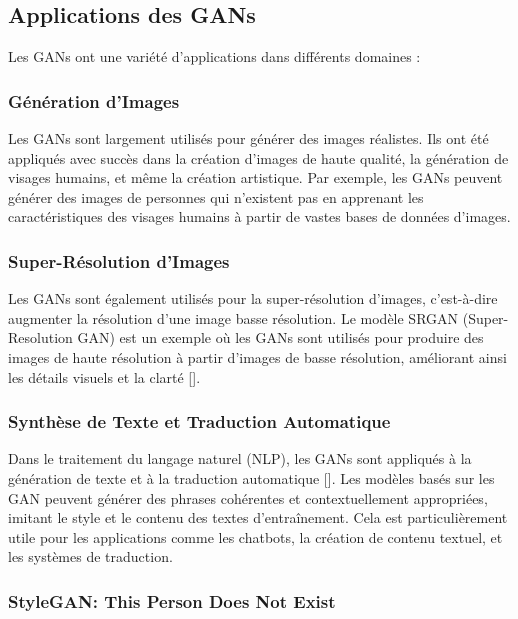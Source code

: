 \subsection{Applications des GANs}

Les GANs ont une variété d'applications dans différents domaines :

\subsubsection{Génération d'Images}

Les GANs sont largement utilisés pour générer des images réalistes. Ils ont été
appliqués avec succès dans la création d'images de haute qualité, la génération
de visages humains, et même la création artistique. Par exemple, les GANs
peuvent générer des images de personnes qui n'existent pas en apprenant les
caractéristiques des visages humains à partir de vastes bases de données
d'images.

\subsubsection{Super-Résolution d'Images}

Les GANs sont également utilisés pour la super-résolution d'images,
c'est-à-dire augmenter la résolution d'une image basse résolution. Le modèle
SRGAN (Super-Resolution GAN) est un exemple où les GANs sont utilisés pour
produire des images de haute résolution à partir d'images de basse résolution,
améliorant ainsi les détails visuels et la clarté [\cite{ledig2017photo}].

\subsubsection{Synthèse de Texte et Traduction Automatique}

Dans le traitement du langage naturel (NLP), les GANs sont appliqués à la
génération de texte et à la traduction automatique [\cite{de2021survey}]. Les
modèles basés sur les GAN peuvent générer des phrases cohérentes et
contextuellement appropriées, imitant le style et le contenu des textes
d'entraînement. Cela est particulièrement utile pour les applications comme les
chatbots, la création de contenu textuel, et les systèmes de traduction.

\subsubsection{StyleGAN: This Person Does Not Exist}

